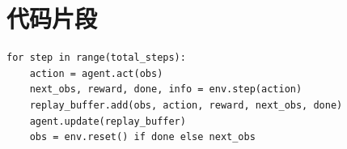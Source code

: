 \section{代码片段}

\begin{lstlisting}[caption={训练循环示例},label={lst:train-loop}]
for step in range(total_steps):
    action = agent.act(obs)
    next_obs, reward, done, info = env.step(action)
    replay_buffer.add(obs, action, reward, next_obs, done)
    agent.update(replay_buffer)
    obs = env.reset() if done else next_obs
\end{lstlisting}
